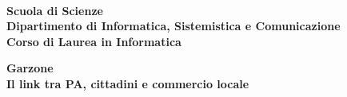 \begin{titlepage}
	\noindent
	\begin{minipage}[t]{0.18\textwidth}
	\end{minipage}
	\begin{minipage}[t]{0.82\textwidth}
		{
			 \\
			\textbf{Scuola di Scienze} \\
			\textbf{Dipartimento di Informatica, Sistemistica e Comunicazione} \\
			\textbf{Corso di Laurea in Informatica} \\
			\par
		}
	\end{minipage}
	
	\vspace{40mm}
	
	\begin{center}
		{\LARGE{
				\textbf{Garzone \\ Il link tra PA, cittadini e commercio locale}
				\par
		}}
	\end{center}
	

\end{titlepage}

